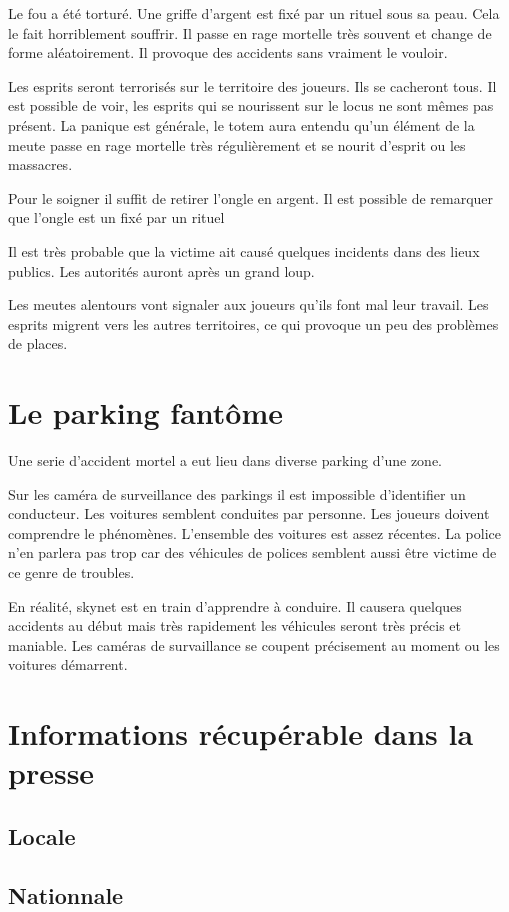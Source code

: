 \documentclass[oneside,12pt]{book}
\begin{document}
\begin{flushleft}
Le fou a été torturé. Une griffe d'argent est fixé par un rituel sous sa peau. Cela le fait horriblement souffrir. 
Il passe en rage mortelle très souvent et change de forme aléatoirement. Il provoque des accidents sans vraiment le vouloir.

Les esprits seront terrorisés sur le territoire des joueurs. Ils se cacheront tous. Il est possible de 
voir, les esprits qui se nourissent sur le locus ne sont mêmes pas présent. La panique est générale, le totem aura entendu
qu'un élément de la meute passe en rage mortelle très régulièrement et se nourit d'esprit ou les massacres.

Pour le soigner il suffit de retirer l'ongle en argent. Il est possible de remarquer que l'ongle est un fixé par un rituel

Il est très probable que la victime ait causé quelques incidents dans des lieux publics. Les autorités auront après un grand loup.

Les meutes alentours vont signaler aux joueurs qu'ils font mal leur travail. Les esprits migrent vers les autres territoires,
ce qui provoque un peu des problèmes de places.

\section{Le parking fantôme}
 Une serie d'accident mortel a eut lieu dans diverse parking d'une zone.

Sur les caméra de surveillance des parkings il est impossible d'identifier un conducteur. Les voitures semblent conduites 
par personne.
Les joueurs doivent comprendre le phénomènes. L'ensemble des voitures est assez récentes. La police n'en parlera
pas trop car des véhicules de polices semblent aussi être victime de ce genre de troubles.

En réalité, skynet est en train d'apprendre à conduire. Il causera quelques accidents au début mais très rapidement les véhicules seront 
très précis et maniable. Les caméras de survaillance se coupent précisement au moment ou les voitures démarrent.
 

\section{Informations récupérable dans la presse}
    \subsection{Locale}
    \subsection{Nationnale}

\end{flushleft}
\end{document}
